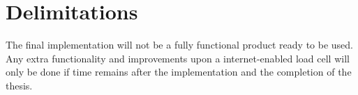 \section{Delimitations}
\iffalse
\begin{itemize}
	\item Scale down expectations and clarify
\end{itemize}
\fi
The final implementation will not be a fully functional product ready to be used. Any extra functionality and improvements upon a internet-enabled load cell will only be done if time remains after the implementation and the completion of the thesis.